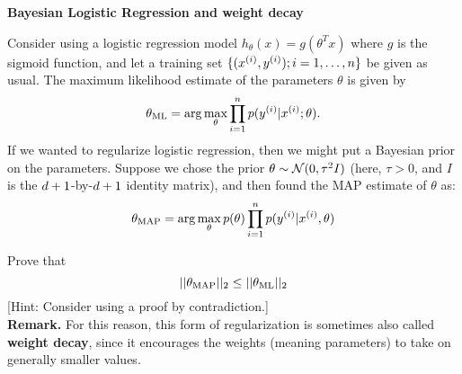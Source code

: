 \item {} {\bf Bayesian Logistic Regression and weight decay}

\newcommand{\thetaml}{{\theta_{\rm ML}}}
\newcommand{\thetamap}{{\theta_{\rm MAP}}}

  Consider using a logistic regression model $h_\theta(x) =
  g(\theta^Tx)$ where $g$ is the sigmoid function, and let a training
  set $\{(x^{(i)}, y^{(i)}); i=1, \ldots, {n}\}$ be given as usual.  The maximum
  likelihood estimate of the parameters $\theta$ is given by
  \[
  \thetaml = \arg \max_\theta \prod_{i=1}^\nexp p(\ysi | \xsi ; \theta).
  \]
  If we wanted to regularize logistic regression, then we might put a
  Bayesian prior on the parameters.  Suppose we chose the prior $\theta
  \sim \mathcal{N}(0,\tau^2I)$ (here, $\tau > 0$, and $I$ is the
  ${d}+1$-by-${d}+1$ identity matrix), and then found the MAP estimate of
  $\theta$ as:
  \[
  \thetamap = \arg \max_\theta p(\theta) \prod_{i=1}^\nexp p(\ysi | \xsi ,
  \theta)
  \]

  Prove that
  \[
  ||\thetamap||_2 \leq ||\thetaml||_2
  \]
  [Hint: Consider using a proof by contradiction.]\\
  {\bf Remark.}  For this reason, this form of regularization is
  sometimes also called {\bf weight decay}, since it encourages the
  weights (meaning parameters) to take on generally smaller values.

\ifnum{} {
  
} \fi

